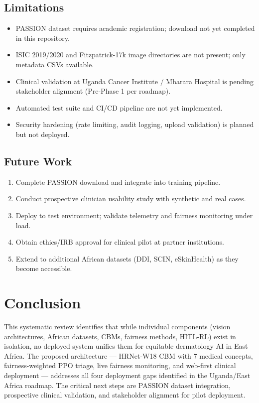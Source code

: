 \documentclass[12pt,a4paper]{article}
\begin{document}
\subsection{Limitations}
\begin{itemize}
    \item PASSION dataset requires academic registration; download not yet completed in this repository.
    \item ISIC 2019/2020 and Fitzpatrick-17k image directories are not present; only metadata CSVs available.
    \item Clinical validation at Uganda Cancer Institute / Mbarara Hospital is pending stakeholder alignment (Pre-Phase 1 per roadmap).
    \item Automated test suite and CI/CD pipeline are not yet implemented.
    \item Security hardening (rate limiting, audit logging, upload validation) is planned but not deployed.
\end{itemize}

\subsection{Future Work}
\begin{enumerate}
    \item Complete PASSION download and integrate into training pipeline.
    \item Conduct prospective clinician usability study with synthetic and real cases.
    \item Deploy to test environment; validate telemetry and fairness monitoring under load.
    \item Obtain ethics/IRB approval for clinical pilot at partner institutions.
    \item Extend to additional African datasets (DDI, SCIN, eSkinHealth) as they become accessible.
\end{enumerate}

\section{Conclusion}
\label{sec:conclusion}

This systematic review identifies that while individual components (vision architectures, African datasets, CBMs, fairness methods, HITL-RL) exist in isolation, no deployed system unifies them for equitable dermatology AI in East Africa. The proposed architecture — HRNet-W18 CBM with 7 medical concepts, fairness-weighted PPO triage, live fairness monitoring, and web-first clinical deployment — addresses all four deployment gaps identified in the Uganda/East Africa roadmap. The critical next steps are PASSION dataset integration, prospective clinical validation, and stakeholder alignment for pilot deployment.



\end{document}
